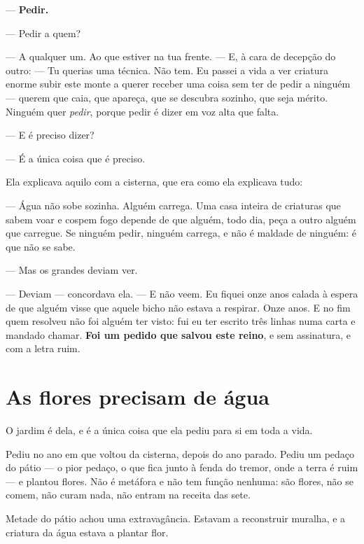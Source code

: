 \documentclass[livro.tex]{subfiles}
\begin{document}
--- \textbf{Pedir.}

--- Pedir a quem?

--- A qualquer um. Ao que estiver na tua frente. --- E, à cara de decepção do outro: --- Tu
querias uma técnica. Não tem. Eu passei a vida a ver criatura enorme subir este monte a querer
receber uma coisa sem ter de pedir a ninguém --- querem que caia, que apareça, que se descubra
sozinho, que seja mérito. Ninguém quer \emph{pedir}, porque pedir é dizer em voz alta que falta.

--- E é preciso dizer?

--- É a única coisa que é preciso.

\medskip

Ela explicava aquilo com a cisterna, que era como ela explicava tudo:

--- Água não sobe sozinha. Alguém carrega. Uma casa inteira de criaturas que sabem voar e cospem
fogo depende de que alguém, todo dia, peça a outro alguém que carregue. Se ninguém pedir, ninguém
carrega, e não é maldade de ninguém: é que não se sabe.

--- Mas os grandes deviam ver.

--- Deviam --- concordava ela. --- E não veem. Eu fiquei onze anos calada à espera de que
alguém visse que aquele bicho não estava a respirar. Onze anos. E no fim quem resolveu não foi
alguém ter visto: fui eu ter escrito três linhas numa carta e mandado chamar. \textbf{Foi um
pedido que salvou este reino}, e sem assinatura, e com a letra ruim.

\section{As flores precisam de água}

O jardim é dela, e é a única coisa que ela pediu para si em toda a vida.

\medskip

Pediu no ano em que voltou da cisterna, depois do ano parado. Pediu um pedaço do pátio --- o pior
pedaço, o que fica junto à fenda do tremor, onde a terra é ruim --- e plantou flores. Não é
metáfora e não tem função nenhuma: são flores, não se comem, não curam nada, não entram na
receita das sete.

Metade do pátio achou uma extravagância. Estavam a reconstruir muralha, e a criatura da água
estava a plantar flor.
\end{document}
